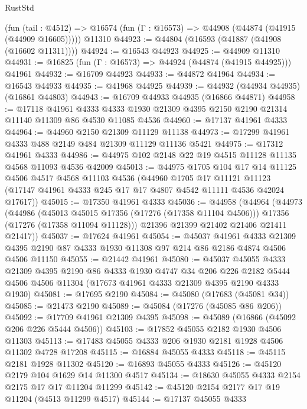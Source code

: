 \begin{lexlean}{RustStd}
\begin{coremodule}
    (fun (tail : @4512) => @16574 (fun (Γ : @16573) => @44908 (@44874 (@41915 (@44909 @16605)))))
    @11310
@44923 := @44804 (@16593 (@41887 (@41908 (@16602 @11311))))
@44924 := @16543 @44923
@44925 := @44909 @11310
@44931 := @16825 (fun (Γ : @16573) => @44924 (@44874 (@41915 @44925))) @41961
@44932 := @16709 @44923
@44933 := @44872 @41964
@44934 := @16543 @44933
@44935 := @41968 @44925
@44939 := @44932 (@44934 @44935) (@16861 @44803)
@44943 := @16709 @44933 @44935 (@16866 @44871)
@44958 := @17118
    @41961
    @4333
    @4333
    @1930
    @21309
    @4395
    @2150
    @2190
    @21314
    @11140
    @11309
    @86
    @4530
    @11085
    @4536
@44960 := @17137 @41961 @4333
@44964 := @44960 @2150 @21309 @11129 @11138
@44973 := @17299 @41961 @4333 @488 @2149 @484 @21309 @11129 @11136 @5421
@44975 := @17312 @41961 @4333
@44986 := @44975 @102 @2148 @22 @19 @4515 @11128 @11135 @4568 @11093 @4536 @42009
@45013 := @44975
    @1705
    @104
    @17
    @14
    @11125
    @4506
    @4517
    @4568
    @11103
    @4536
    (@44960
      @1705
      @17
      @11121
      @11123
      (@17147 @41961 @4333 @245 @17 @17 @4807 @4542 @11111 @4536 @42024 @17617))
@45015 := @17350 @41961 @4333
@45036 := @44958
    (@44964
      (@44973
        (@44986
          (@45013 @45015 @17356 (@17276 (@17358 @11104 @4506)))
          @17356
          (@17276 (@17358 @11094 @11128)))
        @21396
        @21399
        @21402
        @21406
        @21411
        @21417))
@45037 := @17624 @41961
@45054 := @45037
    @41961
    @4333
    @21309
    @4395
    @2190
    @87
    @4333
    @1930
    @11308
    @97
    @214
    @86
    @2186
    @4874
    @4506
    @4506
    @11150
@45055 := @21442 @41961
@45080 := @45037
    @45055
    @4333
    @21309
    @4395
    @2190
    @86
    @4333
    @1930
    @4747
    @34
    @206
    @226
    @2182
    @5444
    @4506
    @4506
    @11304
    (@17673 @41961 @4333 @21309 @4395 @2190 @4333 @1930)
@45081 := @17695 @2190
@45084 := @45080 (@17683 (@45081 @34))
@45085 := @21473 @2190
@45089 := @45084 (@17276 (@45085 @86 @206))
@45092 := @17709 @41961 @21309 @4395
@45098 := @45089 (@16866 (@45092 @206 @226 @5444 @4506))
@45103 := @17852 @45055 @2182 @1930 @4506 @11303
@45113 := @17483 @45055 @4333 @206 @1930 @2181 @1928 @4506 @11302 @4728 @17208
@45115 := @16884 @45055 @4333
@45118 := @45115 @2181 @1928 @11302
@45120 := @16893 @45055 @4333
@45126 := @45120 @2179 @104 @1629 @14 @11300 @4517
@45134 := @18630 @45055 @4333 @2154 @2175 @17 @17 @11204 @11299
@45142 := @45120 @2154 @2177 @17 @19 @11204 (@4513 @11299 @4517)
@45144 := @17137 @45055 @4333

\end{coremodule}
\end{lexlean}
